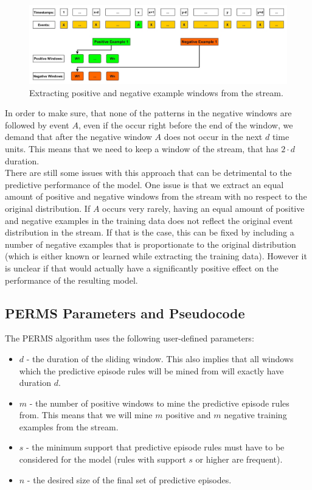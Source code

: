 \begin{figure}[h]
	\centering
  	\includegraphics[width=\textwidth]{trainingDataPositiveAndNegativeWindows}
	\caption{Extracting positive and negative example windows from the stream.}
	\label{fig_trainingDataPositiveAndNegativeWindows}
\end{figure}

In order to make sure, that none of the patterns in the negative windows are followed by event $A$, even if the occur right before the end of the window, we demand that after the negative window $A$ does not occur in the next $d$ time units. This means that we need to keep a window of the stream, that has $2\cdot d$ duration.\\
There are still some issues with this approach that can be detrimental to the predictive performance of the model. One issue is that we extract an equal amount of positive and negative windows from the stream with no respect to the original distribution. If $A$ occurs very rarely, having an equal amount of positive and negative examples in the training data does not reflect the original event distribution in the stream. If that is the case, this can be fixed by including a number of negative examples that is proportionate to the original distribution (which is either known or learned while extracting the training data). However it is unclear if that would actually have a significantly positive effect on the performance of the resulting model.

\subsection{PERMS Parameters and Pseudocode}
\label{subsec_perms}

The PERMS algorithm uses the following user-defined parameters:

\begin{itemize}
	\item \textbf{$d$} - the duration of the sliding window. This also implies that all windows which the predictive episode rules will be mined from will exactly have duration $d$.
	\item \textbf{$m$} - the number of positive windows to mine the predictive episode rules from. This means that we will mine $m$ positive and $m$ negative training examples from the stream.
	\item \textbf{$s$} - the minimum support that predictive episode rules must have to be considered for the model (rules with support $s$ or higher are frequent).
	\item \textbf{$n$} - the desired size of the final set of predictive episodes.
\end{itemize}

